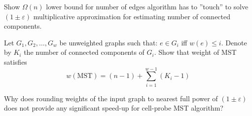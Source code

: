 \documentclass[12pt]{uebung}
\begin{document}
 

\newcommand{\bigo}{\mathcal{O}}
\renewcommand{\aufgname}{Exercise}
\begin{aufg}
Show $\Omega(n)$ lower bound for number of edges algorithm has to ''touch'' to solve $(1\pm\varepsilon)$ multiplicative approximation for estimating number of connected components.
\end{aufg}

\begin{aufg}
Let $G_1,G_2,\ldots,G_w$ be unweighted graphs such that: $e \in G_i$ iff $w(e) \le i$. Denote by $K_i$ the number of connected components of $G_i$.
Show that weight of MST satisfies
$$w(\text{MST}) = (n-1) + \sum_{i=1}^{w-1} (K_i - 1)$$
\end{aufg}

\begin{aufg}
Why does rounding weights of the input graph to nearest full power of $(1\pm \varepsilon)$ does not provide any significant speed-up for cell-probe MST algorithm?
\end{aufg}
\end{document}
